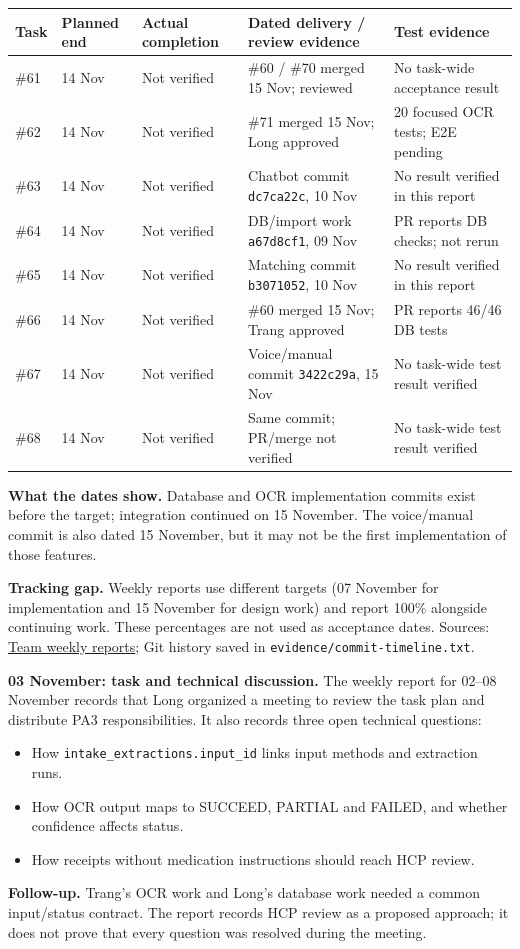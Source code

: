 \documentclass[14pt,a4paper,landscape]{extarticle}
\newcommand{\reportpage}[1]{\clearpage{\Large\bfseries #1\par}\vspace{3mm}}
\newcommand{\weekly}{\href{https://docs.google.com/document/d/1hL1-R4h-wUWRMYfatBCGNO-6FeTvV1qBhrAj1i1jbPk/edit}{Team weekly reports}}
\begin{document}
{\fontsize{12}{14}\selectfont
\begin{tabularx}{\linewidth}{@{}p{17mm}p{25mm}p{30mm}X p{52mm}@{}}\toprule
\textbf{Task} & \textbf{Planned end} & \textbf{Actual completion} & \textbf{Dated delivery / review evidence} & \textbf{Test evidence}\\\midrule
\#61 & 14 Nov & Not verified & \#60 / \#70 merged 15 Nov; reviewed & No task-wide acceptance result\\
\#62 & 14 Nov & Not verified & \#71 merged 15 Nov; Long approved & 20 focused OCR tests; E2E pending\\
\#63 & 14 Nov & Not verified & Chatbot commit \texttt{dc7ca22c}, 10 Nov & No result verified in this report\\
\#64 & 14 Nov & Not verified & DB/import work \texttt{a67d8cf1}, 09 Nov & PR reports DB checks; not rerun\\
\#65 & 14 Nov & Not verified & Matching commit \texttt{b3071052}, 10 Nov & No result verified in this report\\
\#66 & 14 Nov & Not verified & \#60 merged 15 Nov; Trang approved & PR reports 46/46 DB tests\\
\#67 & 14 Nov & Not verified & Voice/manual commit \texttt{3422c29a}, 15 Nov & No task-wide test result verified\\
\#68 & 14 Nov & Not verified & Same commit; PR/merge not verified & No task-wide test result verified\\\bottomrule
\end{tabularx}}

\textbf{What the dates show.} Database and OCR implementation commits exist before the target; integration continued on 15 November. The voice/manual commit is also dated 15 November, but it may not be the first implementation of those features.

\textbf{Tracking gap.} Weekly reports use different targets (07 November for implementation and 15 November for design work) and report 100\% alongside continuing work. These percentages are not used as acceptance dates. Sources: \weekly; Git history saved in \texttt{evidence/commit-timeline.txt}.

\reportpage{4. Team collaboration -- meetings and follow-up}
\textbf{03 November: task and technical discussion.} The weekly report for 02--08 November records that Long organized a meeting to review the task plan and distribute PA3 responsibilities. It also records three open technical questions:
\begin{itemize}
\item How \texttt{intake\_extractions.input\_id} links input methods and extraction runs.
\item How OCR output maps to SUCCEED, PARTIAL and FAILED, and whether confidence affects status.
\item How receipts without medication instructions should reach HCP review.
\end{itemize}
\textbf{Follow-up.} Trang's OCR work and Long's database work needed a common input/status contract. The report records HCP review as a proposed approach; it does not prove that every question was resolved during the meeting.
\end{document}

